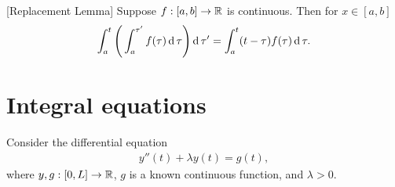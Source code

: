 \begin{lemma} \label{replacement-lemma}
[Replacement Lemma]
Suppose $f: [a,b] \to \mathbb{R}$ is continuous. Then for $x \in [a,b]$
\begin{align*}
  \int_a^t \Bigg(\int_a^{\tau'} f(\tau)\operatorname{\text{d}}\tau\Bigg)\operatorname{\text{d}}\tau' = \int_a^t (t - \tau) f(\tau) \operatorname{\text{d}}\tau.
\end{align*}
\end{lemma}

\section{Integral equations}

Consider the differential equation
\begin{align*}
  y''(t) + \lambda y(t) = g(t),
\end{align*}
where $y, g: [0, L] \to \mathbb{R}$, $g$ is a known continuous function, and $\lambda > 0$.

